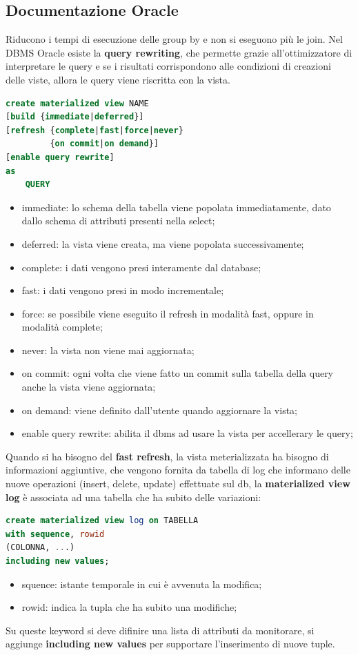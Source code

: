 \documentclass[12pt]{article}
\begin{document}
\subsection{Documentazione Oracle}
Riducono i tempi di esecuzione delle group by e non si eseguono pi\`u le join. Nel DBMS Oracle esiste la \textbf{query rewriting}, che permette grazie all'ottimizzatore di interpretare le query e se i risultati corrispondono alle condizioni di creazioni delle viste, allora le query viene riscritta con la vista.
\begin{lstlisting}[language=sql]
create materialized view NAME
[build {immediate|deferred}]
[refresh {complete|fast|force|never}
         {on commit|on demand}]
[enable query rewrite]
as
    QUERY
\end{lstlisting}
\begin{itemize}
    \item immediate: lo schema della tabella viene popolata immediatamente, dato dallo schema di attributi presenti nella select;
    \item deferred: la vista viene creata, ma viene popolata successivamente;
    \item complete: i dati vengono presi interamente dal database;
    \item fast: i dati vengono presi in modo incrementale;
    \item force: se possibile viene eseguito il refresh in modalit\`a fast, oppure in modalit\`a complete;
    \item never: la vista non viene mai aggiornata;
    \item on commit: ogni volta che viene fatto un commit sulla tabella della query anche la vista viene aggiornata;
    \item on demand: viene definito dall'utente quando aggiornare la vista;
    \item enable query rewrite: abilita il dbms ad usare la vista per accellerary le query;
\end{itemize}
Quando si ha bisogno del \textbf{fast refresh}, la vista meterializzata ha bisogno di informazioni aggiuntive, che vengono fornita da tabella di log che informano delle nuove operazioni (insert, delete, update) effettuate sul db, la \textbf{materialized view log} \`e associata ad una tabella che ha subito delle variazioni:
\begin{lstlisting}[language=sql]
create materialized view log on TABELLA
with sequence, rowid
(COLONNA, ...)
including new values;
\end{lstlisting}
\begin{itemize}
    \item squence: istante temporale in cui \`e avvenuta la modifica;
    \item rowid: indica la tupla che ha subito una modifiche;
\end{itemize}
Su queste keyword si deve difinire una lista di attributi da monitorare, si aggiunge \textbf{including new values} per supportare l'inserimento di nuove tuple.
\end{document}

